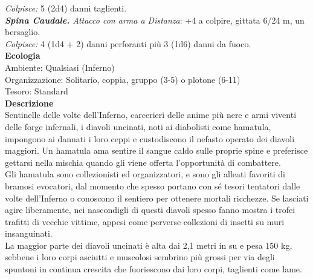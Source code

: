 \begin{multicols}{2}
\emph{Colpisce:} 5 (2d4) danni taglienti.\\
\emph{\textbf{Spina Caudale.} Attacco con arma a Distanza}: +4 a colpire, gittata 6/24 m, un bersaglio.\\
\emph{Colpisce:} 4 (1d4 + 2) danni perforanti più 3 (1d6) danni da fuoco.\\
\textbf{Ecologia}\\
Ambiente: Qualsiasi (Inferno)\\
Organizzazione: Solitario, coppia, gruppo (3-5) o plotone (6-11)\\
Tesoro: Standard\\
\textbf{Descrizione}\\
Sentinelle delle volte dell’Inferno, carcerieri delle anime più nere e armi viventi delle forge infernali, i diavoli uncinati, noti ai diabolisti come hamatula, impongono ai dannati i loro ceppi e custodiscono il nefasto operato dei diavoli maggiori. Un hamatula ama sentire il sangue caldo sulle proprie spine e preferisce gettarsi nella mischia quando gli viene offerta l’opportunità di combattere.\\
Gli hamatula sono collezionisti ed organizzatori, e sono gli alleati favoriti di bramosi evocatori, dal momento che spesso portano con sé tesori tentatori dalle volte dell’Inferno o conoscono il sentiero per ottenere mortali ricchezze. Se lasciati agire liberamente, nei nascondigli di questi diavoli spesso fanno mostra i trofei trafitti di vecchie vittime, appesi come perverse collezioni di insetti su muri insanguinati.\\
La maggior parte dei diavoli uncinati è alta dai 2,1 metri in su e pesa 150 kg, sebbene i loro corpi asciutti e muscolosi sembrino più grossi per via degli spuntoni in continua crescita che fuoriescono dai loro corpi, taglienti come lame.\\


\end{multicols}
